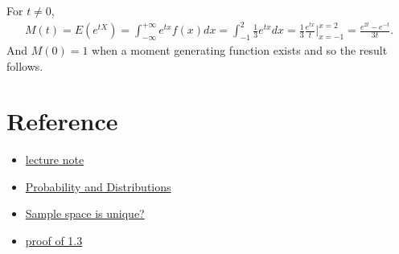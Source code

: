 \begin{solve}
    For $t\neq 0$, 
    \begin{align*}
        M(t)=E(e^{tX})=\int_{-\infty}^{+\infty} e^{tx}f(x)dx = \int_{-1}^{2}\frac{1}{3}e^{tx}dx = \frac{1}{3}\frac{e^{tx}}{t}|_{x=-1}^{x=2}=\frac{e^{2t}-e^{-t}}{3t}.
    \end{align*}
    And $M(0) = 1$ when a moment generating function
    exists and so the result follows.
\end{solve}

\section{Reference}
\begin{itemize}
    \item \href{https://faculty.etsu.edu/gardnerr/4047/notes-Hogg-McKean-Craig.htm}{lecture note}
    \item \href{https://ccrgpages.rit.edu/~whelan/courses/2013_3fa_STAT_405/notes01.pdf}{Probability and Distributions}
    \item \href{https://www.zhihu.com/question/28624845}{Sample space is unique?}
    \item \href{https://faculty.etsu.edu/gardnerr/4047/Beamer-Hogg-McKean-Craig/Proofs-HMC-1-3.pdf}{proof of 1.3}
\end{itemize}
